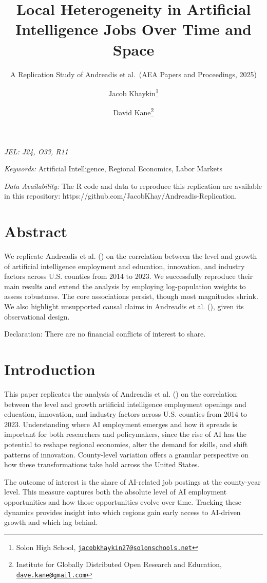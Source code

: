 \documentclass[
]{article}
\title{Local Heterogeneity in Artificial Intelligence Jobs Over Time and
Space}
\subtitle{A Replication Study of Andreadis et al.~(AEA Papers and
Proceedings, 2025)}
\author{Jacob Khaykin\footnote{Solon High School,
  \href{mailto:jacobkhaykin27@solonschools.net}{\nolinkurl{jacobkhaykin27@solonschools.net}}} \and David
Kane\footnote{Institute for Globally Distributed Open Research and
  Education,
  \href{mailto:dave.kane@gmail.com}{\nolinkurl{dave.kane@gmail.com}}}}
\date{}
\begin{document}
\maketitle


\emph{JEL: J24, O33, R11}

\emph{Keywords:} Artificial Intelligence, Regional Economics, Labor
Markets

\emph{Data Availability:} The R code and data to reproduce this
replication are available in this repository:
https://github.com/JacobKhay/Andreadis-Replication.

\section*{Abstract}\label{abstract}

We replicate Andreadis et al. () on
the correlation between the level and growth of artificial intelligence
employment and education, innovation, and industry factors across U.S.
counties from 2014 to 2023. We successfully reproduce their main results
and extend the analysis by employing log-population weights to assess
robustness. The core associations persist, though most magnitudes
shrink. We also highlight unsupported causal claims in Andreadis et al.
(), given its observational design.

Declaration: There are no financial conflicts of interest to share.

\newpage

\section{Introduction}\label{introduction}

This paper replicates the analysis of Andreadis et al.
() on the correlation between the
level and growth artificial intelligence employment openings and
education, innovation, and industry factors across U.S. counties from
2014 to 2023. Understanding where AI employment emerges and how it
spreads is important for both researchers and policymakers, since the
rise of AI has the potential to reshape regional economies, alter the
demand for skills, and shift patterns of innovation. County-level
variation offers a granular perspective on how these transformations
take hold across the United States.

The outcome of interest is the share of AI-related job postings at the
county-year level. This measure captures both the absolute level of AI
employment opportunities and how those opportunities evolve over time.
Tracking these dynamics provides insight into which regions gain early
access to AI-driven growth and which lag behind.
\end{document}
